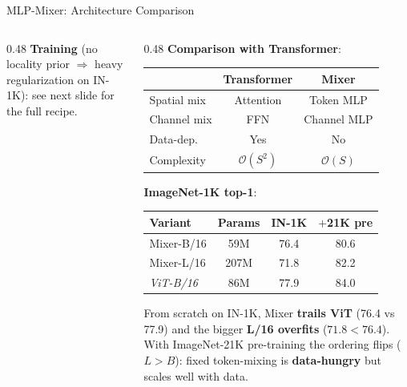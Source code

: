 \begin{frame}{MLP-Mixer: Architecture Comparison}
\begin{columns}
\begin{column}{0.48\textwidth}
      \vspace{0.3em}
      \textbf{Training} (no locality prior $\Rightarrow$ heavy regularization on IN-1K): see next slide for the full recipe.
    \end{column}
    \begin{column}{0.48\textwidth}
      \textbf{Comparison with Transformer}:
      \begin{center}
        \small
        \begin{tabular}{lcc}
          \toprule
          & \textbf{Transformer} & \textbf{Mixer} \\
          \midrule
          Spatial mix & Attention & Token MLP \\
          Channel mix & FFN & Channel MLP \\
          Data-dep.\ & Yes & No \\
          Complexity & $\mathcal{O}(S^2)$ & $\mathcal{O}(S)$ \\
          \bottomrule
        \end{tabular}
      \end{center}

      \vspace{0.4em}
      \textbf{ImageNet-1K top-1}:
      \begin{center}
        \small
        \begin{tabular}{lccc}
          \toprule
          \textbf{Variant} & \textbf{Params} & \textbf{IN-1K} & \textbf{$+$21K pre} \\
          \midrule
          Mixer-B/16 & 59M  & 76.4 & 80.6 \\
          Mixer-L/16 & 207M & 71.8 & 82.2 \\
          \midrule
          \textit{ViT-B/16} & 86M & 77.9 & 84.0 \\
          \bottomrule
        \end{tabular}
      \end{center}

      {\footnotesize From scratch on IN-1K, Mixer \textbf{trails ViT} (76.4 vs 77.9) and the bigger \textbf{L/16 overfits} ($71.8 < 76.4$). With ImageNet-21K pre-training the ordering flips ($L{>}B$): fixed token-mixing is \textbf{data-hungry} but scales well with data.}
    \end{column}
  \end{columns}
\end{frame}

